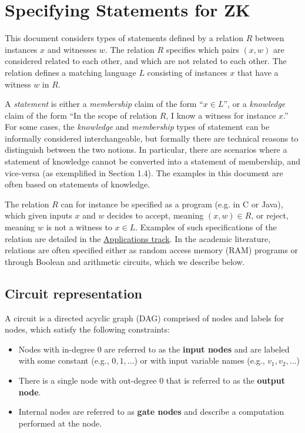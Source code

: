 \section{Specifying Statements for ZK}
\label{security:spec-statements-ZK}

 
	This document considers types of statements defined by a relation $R$ between instances $x$ and witnesses $w$.
	The relation $R$ specifies which pairs $(x,w)$ are considered related to each other, and which are not related to each other.
	The relation defines a matching language $L$ consisting of instances $x$ that have a witness $w$ in $R$.


	A \emph{statement} is either a \emph{membership} claim of the form ``$x \in L$'', 
or a \emph{knowledge} claim of the form ``In the scope of relation $R$, I know a witness for instance $x$.''
	For some cases, the \emph{knowledge} and \emph{membership} types of statement can be informally considered interchangeable, but formally there are technical reasons to distinguish between the two notions. 
	In particular, there are scenarios where a statement of knowledge cannot be converted into a statement of membership, and vice-versa (as exemplified in Section 1.4).
	The examples in this document are often based on statements of knowledge.
	\loosen

 
	The relation $R$ can for instance be specified as a program (e.g. in C or Java), which given inputs $x$ and $w$ decides to accept, meaning $(x,w) \in R$, or reject, meaning $w$ is not a witness to $x \in L$. 
	Examples of such specifications of the relation are detailed in the \hyperref[chap:apps]{Applications track}.
	In the academic literature, relations are often specified either as 
random access memory (RAM) programs or through Boolean and arithmetic circuits, which we describe below.



\subsection{Circuit representation}
\label{security:spec-statements-ZK:circuit-representation}

A circuit is a directed acyclic graph (DAG) comprised of nodes and labels for nodes, which satisfy the following constraints:
\begin{itemize}
\item Nodes with in-degree 0 are referred to as the \textbf{input nodes} and are labeled with some constant (e.g., $0, 1, \ldots$) or with input variable names (e.g., $v_1, v_2, \ldots$)
\item There is a single node with out-degree 0 that is referred to as the \textbf{output node}.
\item Internal nodes are referred to as \textbf{gate nodes} and describe a computation performed at the node.\loosen
\end{itemize}


